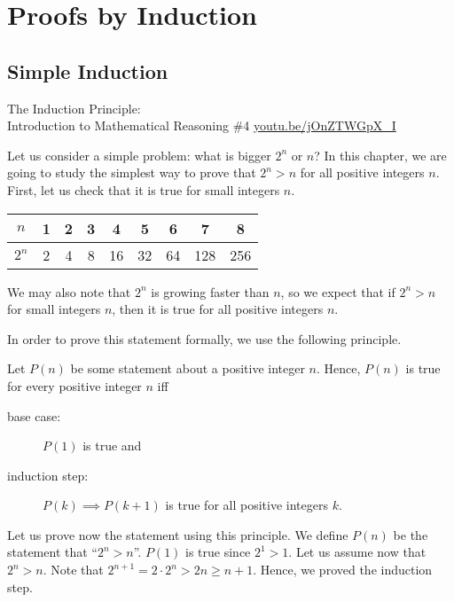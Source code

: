 \chapter{Proofs by Induction}
\section{Simple Induction}
\begin{marginfigure}
  {\scriptsize The Induction Principle:\\\noindent
  Introduction to Mathematical Reasoning \#4}
  \vskip 0.25cm
  \noindent
  \vskip 0.25cm
  \noindent
  \url{youtu.be/jOnZTWGpX_I}
\end{marginfigure}

Let us consider a simple problem: what is bigger $2^n$ or $n$? In this chapter,
we are going to study the simplest way to prove that $2^n > n$ for all positive
integers $n$. First, let us check that it is true for small integers $n$.
\begin{center}
  \begin{tabular}{c | c | c | c | c | c | c | c | c}
    $n$   & 1 & 2 & 3 & 4  & 5  & 6  & 7   & 8   \\
    \hline
    $2^n$ & 2 & 4 & 8 & 16 & 32 & 64 & 128 & 256
  \end{tabular}
\end{center}
We may also note that $2^n$ is growing faster than $n$, so we expect that if
$2^n > n$ for small integers $n$, then it is true for all positive integers $n$.

In order to prove this statement formally, we use the following principle.
\begin{principle}
  Let $P(n)$ be some statement about a positive integer $n$.
  Hence, $P(n)$ is true for every positive integer $n$ iff
  \begin{description}
    \item[base case:] $P(1)$ is true and
    \item[induction step:] $P(k) \implies P(k + 1)$ is true for all positive
      integers $k$.
  \end{description}
\end{principle}

Let us prove now the statement using this principle.
We define $P(n)$ be the statement that ``$2^n > n$''.
$P(1)$ is true since $2^1 > 1$. Let us assume now that $2^n > n$. Note that
$2^{n + 1} = 2 \cdot 2^n > 2n \ge n + 1$. Hence, we proved the induction step.

